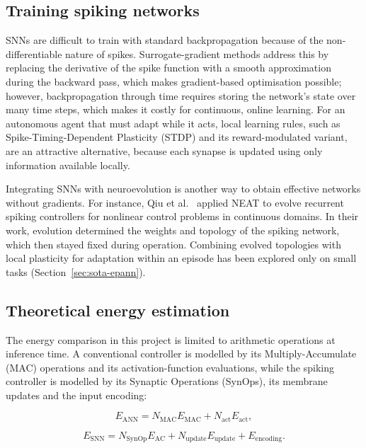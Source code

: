 \subsection{Training spiking networks}

SNNs are difficult to train with standard backpropagation because of the non-differentiable nature of spikes. Surrogate-gradient methods \cite{neftci2019surrogate} address this by replacing the derivative of the spike function with a smooth approximation during the backward pass, which makes gradient-based optimisation possible; however, backpropagation through time requires storing the network's state over many time steps, which makes it costly for continuous, online learning. For an autonomous agent that must adapt while it acts, local learning rules, such as Spike-Timing-Dependent Plasticity (STDP) and its reward-modulated variant, are an attractive alternative, because each synapse is updated using only information available locally.

Integrating SNNs with neuroevolution is another way to obtain effective networks without gradients. For instance, Qiu et al.\ \cite{qiu2018evolving} applied NEAT to evolve recurrent spiking controllers for nonlinear control problems in continuous domains. In their work, evolution determined the weights and topology of the spiking network, which then stayed fixed during operation. Combining evolved topologies with local plasticity for adaptation within an episode has been explored only on small tasks (Section~\ref{sec:sota-epann}).

\subsection{Theoretical energy estimation}
\label{sec:energy-estimation}

The energy comparison in this project is limited to arithmetic operations at inference time. A conventional controller is modelled by its Multiply-Accumulate (MAC) operations and its activation-function evaluations, while the spiking controller is modelled by its Synaptic Operations (SynOps), its membrane updates and the input encoding:

\begin{equation}
    E_{\mathrm{ANN}} = N_{\mathrm{MAC}} E_{\mathrm{MAC}} + N_{\mathrm{act}} E_{\mathrm{act}},
\end{equation}

\begin{equation}
    E_{\mathrm{SNN}} = N_{\mathrm{SynOp}} E_{\mathrm{AC}} + N_{\mathrm{update}} E_{\mathrm{update}} + E_{\mathrm{encoding}}.
\end{equation}

